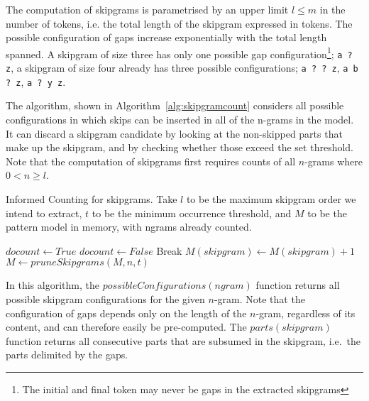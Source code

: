 \documentclass[a4paper,12pt]{article}
\begin{document}
The computation of skipgrams is parametrised by an upper limit $l\leq m$ in the number of
tokens, i.e. the total length of the skipgram expressed in tokens. The possible configuration of gaps increase exponentially with the
total length spanned. A skipgram of size three has only one possible
gap configuration\footnote{The initial and final token may never be gaps in the extracted skipgrams};
\texttt{a ? z}, a skipgram of size four already has three possible configurations;
\texttt{a ? ? z}, \texttt{a b ? z}, \texttt{a ? y z}.

The algorithm, shown in Algorithm~\ref{alg:skipgramcount} considers all
possible configurations in which skips can be inserted in all of the n-grams in the model. It can
discard a skipgram candidate by looking at the non-skipped parts that make up
the skipgram, and by checking whether those exceed the set threshold. Note that
the computation of skipgrams first requires counts of all $n$-grams where
$0<n\geq l$. 

\begin{algorithm} \caption{Informed Counting for skipgrams.  Take $l$
to be the maximum skipgram order we intend to extract, $t$ to be the minimum occurrence threshold, and $M$ to be the
pattern model in memory, with ngrams already counted.}
\label{alg:skipgramcount}
\begin{algorithmic}
            \State $docount \leftarrow True$
                    \State $docount \leftarrow False$
                    Break
                \EndIf
            \EndFor 
                \State $M(skipgram) \leftarrow M(skipgram) + 1$
            \EndIf
            \EndFor 
            \EndFor
    \State $M \leftarrow pruneSkipgrams(M,n,t)$
\EndFor \\
\end{algorithmic}
\end{algorithm}

In this algorithm, the $possibleConfigurations(ngram)$ function returns
all possible skipgram configurations for the given $n$-gram. Note that
the configuration of gaps depends only on the length of the $n$-gram, regardless
of its content, and can therefore easily be pre-computed. The
$parts(skipgram)$ function returns all consecutive parts that are
subsumed in the skipgram, i.e.\ the parts delimited by the gaps.
\end{document}
